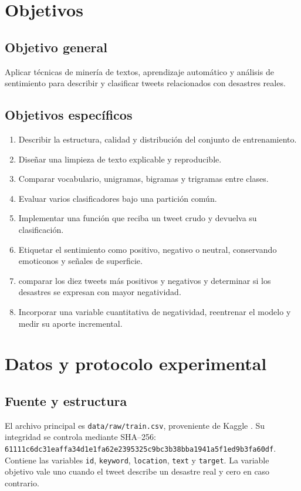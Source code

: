 \documentclass[11pt,letterpaper]{article}
\begin{document}
\section{Objetivos}

\subsection{Objetivo general}

Aplicar técnicas de minería de textos, aprendizaje automático y análisis de sentimiento para describir y clasificar tweets relacionados con desastres reales.

\subsection{Objetivos específicos}

\begin{enumerate}
  \item Describir la estructura, calidad y distribución del conjunto de entrenamiento.
  \item Diseñar una limpieza de texto explicable y reproducible.
  \item Comparar vocabulario, unigramas, bigramas y trigramas entre clases.
  \item Evaluar varios clasificadores bajo una partición común.
  \item Implementar una función que reciba un tweet crudo y devuelva su clasificación.
  \item Etiquetar el sentimiento como positivo, negativo o neutral, conservando emoticonos y señales de superficie.
  \item comparar los diez tweets más positivos y negativos y determinar si los desastres se expresan con mayor negatividad.
  \item Incorporar una variable cuantitativa de negatividad, reentrenar el modelo y medir su aporte incremental.
\end{enumerate}

\section{Datos y protocolo experimental}

\subsection{Fuente y estructura}

El archivo principal es \texttt{data/raw/train.csv}, proveniente de Kaggle \cite{kaggle}. Su integridad se controla mediante SHA--256: \texttt{61111c6dc31eaffa34d1e1fa62e2395325c9bc3b38bba1941a5f1ed9b3fa60df}. Contiene las variables \texttt{id}, \texttt{keyword}, \texttt{location}, \texttt{text} y \texttt{target}. La variable objetivo vale uno cuando el tweet describe un desastre real y cero en caso contrario.
\end{document}
